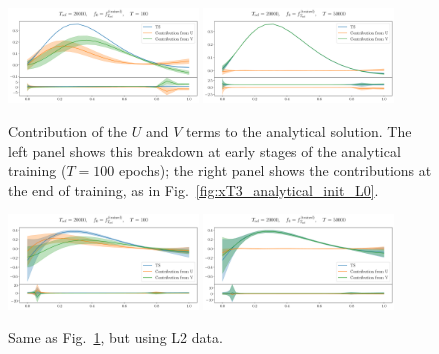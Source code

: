 \begin{figure}[h]
    \centering
    \includegraphics[width=0.45\textwidth]{plots/analytical_solution/pdf_plot_u_v_100_L0.pdf}
    \includegraphics[width=0.45\textwidth]{plots/analytical_solution/pdf_plot_u_v_50000_L0.pdf}
    \caption{Contribution of the $U$ and $V$ terms to the analytical solution. The left
    panel shows this breakdown at early stages of the analytical training
    ($T=100$ epochs); the right panel shows the contributions at the end of
    training, as in Fig.~\ref{fig:xT3_analytical_init_L0}.}
    \label{fig:xT3_u_v_contributions_L0}
  \end{figure}

  \begin{figure}[h]
    \centering
    \includegraphics[width=0.45\textwidth]{plots/analytical_solution/pdf_plot_u_v_100_L2.pdf}
    \includegraphics[width=0.45\textwidth]{plots/analytical_solution/pdf_plot_u_v_50000_L2.pdf}
    \caption{Same as Fig.~\ref{fig:xT3_u_v_contributions_L0}, but using L2 data.}
    \label{fig:xT3_u_v_contributions_L2}
  \end{figure}


\FloatBarrier
